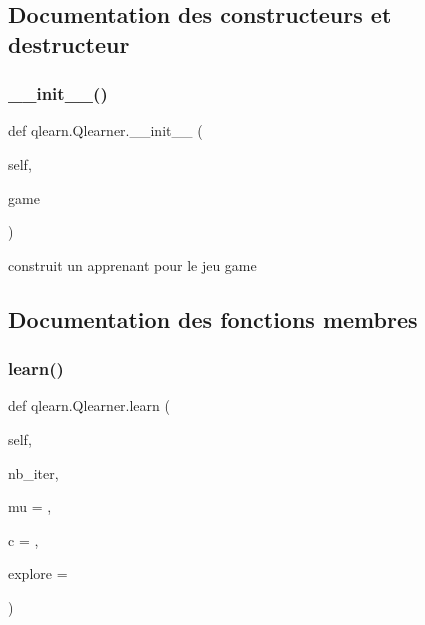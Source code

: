 \subsection{Documentation des constructeurs et destructeur}
\mbox{\label{classqlearn_1_1Qlearner_a2358d27a7a8833adaf69138ceda4d7aa}} 
\subsubsection{\texorpdfstring{\+\_\+\+\_\+init\+\_\+\+\_\+()}{\_\_init\_\_()}}
{\footnotesize\ttfamily def qlearn.\+Qlearner.\+\_\+\+\_\+init\+\_\+\+\_\+ (\begin{DoxyParamCaption}\item[{}]{self,  }\item[{}]{game }\end{DoxyParamCaption})}

\begin{DoxyVerb}construit un apprenant pour le jeu game 
\end{DoxyVerb}
 

\subsection{Documentation des fonctions membres}
\mbox{\label{classqlearn_1_1Qlearner_a21001f2c11418262b3b0cfc58fb91f72}} 
\subsubsection{\texorpdfstring{learn()}{learn()}}
{\footnotesize\ttfamily def qlearn.\+Qlearner.\+learn (\begin{DoxyParamCaption}\item[{}]{self,  }\item[{}]{nb\+\_\+iter,  }\item[{}]{mu = {},  }\item[{}]{c = {},  }\item[{}]{explore = {} }\end{DoxyParamCaption})}

